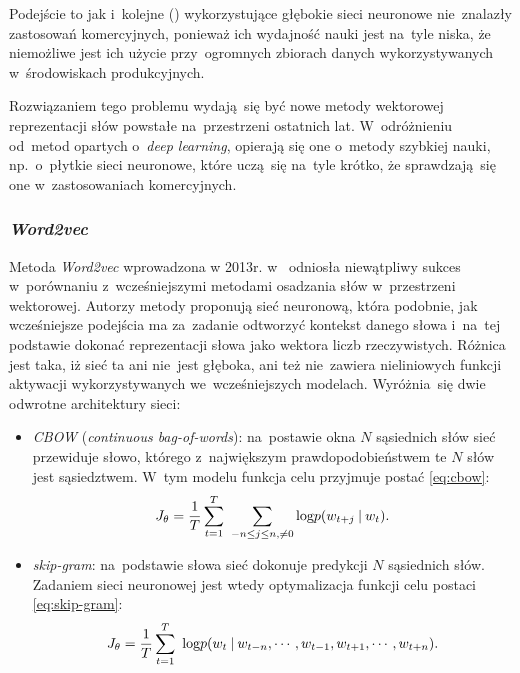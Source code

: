 \documentclass[pl]{minipw} %
\begin{document}
Podejście to jak i~kolejne (\cite{c_w}) wykorzystujące głębokie sieci neuronowe nie~znalazły zastosowań komercyjnych, ponieważ ich wydajność nauki jest na~tyle niska, że niemożliwe jest ich użycie przy~ogromnych zbiorach danych wykorzystywanych w~środowiskach produkcyjnych.


Rozwiązaniem tego problemu wydają~się być nowe metody wektorowej reprezentacji słów powstałe na~przestrzeni ostatnich lat. W~odróżnieniu od~metod opartych o~\textit{deep learning}, opierają się one o~metody szybkiej nauki, np.~o~płytkie sieci neuronowe, które uczą~się na~tyle krótko, że sprawdzają~się one w~zastosowaniach komercyjnych.


\subsubsection{\textit{Word2vec}}%

Metoda \textit{Word2vec} wprowadzona w 2013r. w~\cite{word2vec} odniosła niewątpliwy sukces w~porównaniu z~wcześniejszymi metodami osadzania słów w~przestrzeni wektorowej. Autorzy metody proponują sieć neuronową, która podobnie, jak wcześniejsze podejścia ma za~zadanie odtworzyć kontekst danego słowa i~na~tej podstawie dokonać reprezentacji słowa jako wektora liczb rzeczywistych. Różnica jest taka, iż sieć ta ani nie~jest głęboka, ani też nie~zawiera nieliniowych funkcji aktywacji wykorzystywanych we~wcześniejszych modelach. Wyróżnia~się dwie odwrotne architektury sieci:
\begin{itemize}
	\item \textit{CBOW} (\textit{continuous bag-of-words}): na~postawie okna $N$ sąsiednich słów sieć przewiduje słowo, którego z~największym prawdopodobieństwem te $N$ słów jest sąsiedztwem. W~tym modelu funkcja celu przyjmuje postać \ref{eq:cbow}:
	\begin{equation}
	\label{eq:cbow}
	J_\theta = \frac{1}{T}\sum\limits_{t=1}^T\ \sum\limits_{-n \leq j \leq n , \neq 0} \text{log} \space p(w_{t+j} \: | \: w_t).
	\end{equation}
	\item \textit{skip-gram}: na~podstawie słowa sieć dokonuje predykcji $N$ sąsiednich słów. Zadaniem sieci neuronowej jest wtedy optymalizacja funkcji celu postaci \ref{eq:skip-gram}:
	\begin{equation}
	\label{eq:skip-gram}
	J_\theta = \frac{1}{T}\sum\limits_{t=1}^T\ \text{log} \space p(w_t \: | \: w_{t-n} , \cdots , w_{t-1}, w_{t+1}, \cdots , w_{t+n}).
	\end{equation}
\end{itemize}
\end{document}
